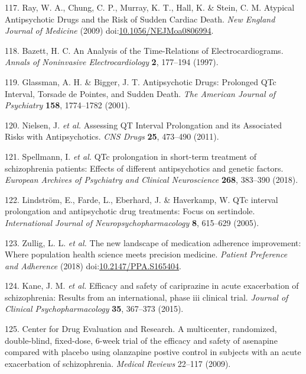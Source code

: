 \documentclass[9pt,english,,jou,floatsintext]{apa6}
\begin{document}
\hypertarget{ref-Ray2009}{}
117. Ray, W. A., Chung, C. P., Murray, K. T., Hall, K. \& Stein, C. M.
Atypical Antipsychotic Drugs and the Risk of Sudden Cardiac Death.
\emph{New England Journal of Medicine} (2009)
doi:\href{https://doi.org/10.1056/NEJMoa0806994}{10.1056/NEJMoa0806994}.

\hypertarget{ref-Bazett1997}{}
118. Bazett, H. C. An Analysis of the Time-Relations of
Electrocardiograms. \emph{Annals of Noninvasive Electrocardiology}
\textbf{2}, 177--194 (1997).

\hypertarget{ref-Glassman2001}{}
119. Glassman, A. H. \& Bigger, J. T. Antipsychotic Drugs: Prolonged QTc
Interval, Torsade de Pointes, and Sudden Death. \emph{The American
Journal of Psychiatry} \textbf{158}, 1774--1782 (2001).

\hypertarget{ref-Nielsen2011}{}
120. Nielsen, J. \emph{et al.} Assessing QT Interval Prolongation and
its Associated Risks with Antipsychotics. \emph{CNS Drugs} \textbf{25},
473--490 (2011).

\hypertarget{ref-Spellmann2018}{}
121. Spellmann, I. \emph{et al.} QTc prolongation in short-term
treatment of schizophrenia patients: Effects of different antipsychotics
and genetic factors. \emph{European Archives of Psychiatry and Clinical
Neuroscience} \textbf{268}, 383--390 (2018).

\hypertarget{ref-Lindstroem2005}{}
122. Lindström, E., Farde, L., Eberhard, J. \& Haverkamp, W. QTc
interval prolongation and antipsychotic drug treatments: Focus on
sertindole. \emph{International Journal of Neuropsychopharmacology}
\textbf{8}, 615--629 (2005).

\hypertarget{ref-Zullig2018}{}
123. Zullig, L. L. \emph{et al.} The new landscape of medication
adherence improvement: Where population health science meets precision
medicine. \emph{Patient Preference and Adherence} (2018)
doi:\href{https://doi.org/10.2147/PPA.S165404}{10.2147/PPA.S165404}.

\hypertarget{ref-Kane2015a}{}
124. Kane, J. M. \emph{et al.} Efficacy and safety of cariprazine in
acute exacerbation of schizophrenia: Results from an international,
phase iii clinical trial. \emph{Journal of Clinical Psychopharmacology}
\textbf{35}, 367--373 (2015).

\hypertarget{ref-Hera2009a}{}
125. Center for Drug Evaluation and Research. A multicenter, randomized,
double-blind, fixed-dose, 6-week trial of the efficacy and safety of
asenapine compared with placebo using olanzapine postive control in
subjects with an acute exacerbation of schizophrenia. \emph{Medical
Reviews} 22--117 (2009).
\end{document}
